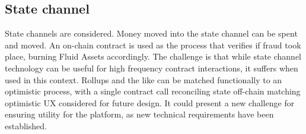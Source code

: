 \subsection{State channel}

State channels are considered. Money moved into the state channel can be spent and moved. An on-chain contract is used as the process that verifies if fraud took place, burning Fluid Assets accordingly. The challenge is that while state channel technology can be useful for high frequency contract interactions, it suffers when used in this context. Rollups and the like can be matched functionally to an optimistic process, with a single contract call reconciling state off-chain matching optimistic UX considered for future design. It could present a new challenge for ensuring utility for the platform, as new technical requirements have been established.

